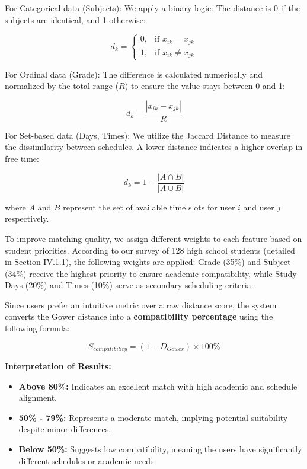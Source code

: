 \documentclass[a4paper,12pt]{report}
\begin{document}
For Categorical data (Subjects): We apply a binary logic. The distance is 0 if the subjects are identical, and 1 otherwise:

\[
d_k = \left\{
\begin{array}{ll}
0, & \text{if } x_{ik} = x_{jk} \\
1, & \text{if } x_{ik} \neq x_{jk}
\end{array}
\right.
\]

For Ordinal data (Grade): The difference is calculated numerically and normalized by the total range ($R$) to ensure the value stays between 0 and 1:

\[
d_k = \frac{|x_{ik} - x_{jk}|}{R}
\]

For Set-based data (Days, Times): We utilize the Jaccard Distance to measure the dissimilarity between schedules. A lower distance indicates a higher overlap in free time:

\[
d_k = 1 - \frac{|A \cap B|}{|A \cup B|}
\]

where $A$ and $B$ represent the set of available time slots for user $i$ and user $j$ respectively.

To improve matching quality, we assign different weights to each feature based on student priorities. According to our survey of 128 high school students (detailed in Section IV.1.1), the following weights are applied: Grade (35\%) and Subject (34\%) receive the highest priority to ensure academic compatibility, while Study Days (20\%) and Times (10\%) serve as secondary scheduling criteria.


\noindent Since users prefer an intuitive metric over a raw distance score, the system converts the Gower distance into a \textbf{compatibility percentage} using the following formula:

\[
    S_{compatibility} = (1 - D_{Gower}) \times 100\%
\]

\noindent \textbf{Interpretation of Results:}
\begin{itemize}
    \item \textbf{Above 80\%:} Indicates an excellent match with high academic and schedule alignment.
    \item \textbf{50\% - 79\%:} Represents a moderate match, implying potential suitability despite minor differences.
    \item \textbf{Below 50\%:} Suggests low compatibility, meaning the users have significantly different schedules or academic needs.
\end{itemize}
\end{document}
